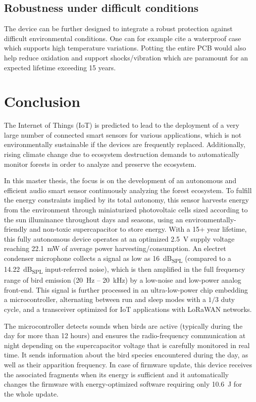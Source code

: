 \documentclass{EPL-master-thesis-covers-EN}
\begin{document}
\section{Robustness under difficult conditions}

The device can be further designed to integrate a robust protection against difficult environmental conditions. One can for example cite a waterproof case which supports high temperature variations. Potting the entire PCB would also help reduce oxidation and support shocks/vibration which are paramount for an expected lifetime exceeding 15 years.


\chapter{Conclusion}
\label{chapter:conclusion}

The Internet of Things (IoT) is predicted to lead to the deployment of a very large number of connected smart sensors for various applications, which is not environmentally sustainable if the devices are frequently replaced.
Additionally, rising climate change due to ecosystem destruction demands to automatically monitor forests in order to analyze and preserve the ecosystem.

In this master thesis, the focus is on the development of an autonomous and efficient audio smart sensor continuously analyzing the forest ecosystem. To fulfill the energy constraints implied by its total autonomy, this sensor harvests energy from the environment through miniaturized photovoltaic cells sized according to the sun illuminance throughout days and seasons, using an environmentally-friendly and non-toxic supercapacitor to store energy.
With a 15+ year lifetime, this fully autonomous device operates at an optimized \SI{2.5}{V} supply voltage reaching \SI{22.1}{mW} of average power harvesting/consumption. An electret condenser microphone collects a signal as low as \SI{16}{dB_{SPL}} (compared to a \SI{14.22}{dB_{SPL}} input-referred noise), which is then amplified in the full frequency range of bird emission (\SI{20}{Hz} -- \SI{20}{kHz}) by a low-noise and low-power analog front-end. This signal is further processed in an ultra-low-power chip embedding a microcontroller, alternating between run and sleep modes with a $1/3$ duty cycle, and a transceiver optimized for IoT applications with LoRaWAN networks.

The microcontroller detects sounds when birds are active (typically during the day for more than 12 hours) and ensures the radio-frequency communication at night depending on the supercapacitor voltage that is carefully monitored in real time. It sends information about the bird species encountered during the day, as well as their apparition frequency. In case of firmware update, this device receives the associated fragments when its energy is sufficient and it automatically changes the firmware with energy-optimized software requiring only \SI{10.6}{J} for the whole update.
\end{document}
